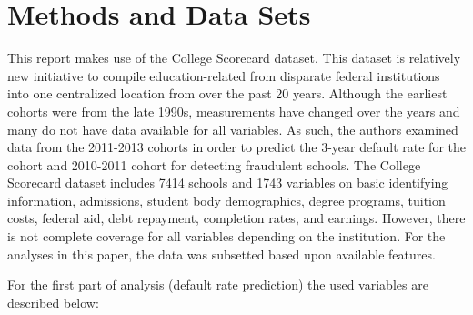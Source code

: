 \documentclass[10pt,twocolumn]{article}
\begin{document}
\section{Methods and Data Sets}
This report makes use of the College Scorecard dataset. This dataset is relatively new
initiative to compile education-related from disparate federal institutions into
one centralized location from over the past 20 years.
Although the earliest cohorts were from the late 1990s, measurements have changed
over the years and many do not have data available for all variables.
As such, the authors examined data from the 2011-2013 cohorts in order to predict
the 3-year default rate for the cohort and 2010-2011 cohort for detecting fraudulent
schools. The College Scorecard dataset includes 7414 schools and 1743 variables on basic
identifying information, admissions, student body demographics, degree programs,
tuition costs, federal aid, debt repayment, completion rates, and earnings.
However, there is not complete coverage for all variables depending on the
institution. For the analyses in this paper, the data was subsetted based upon available
features.

For the first part of analysis (default rate prediction) the used variables are described below:
\end{document}
